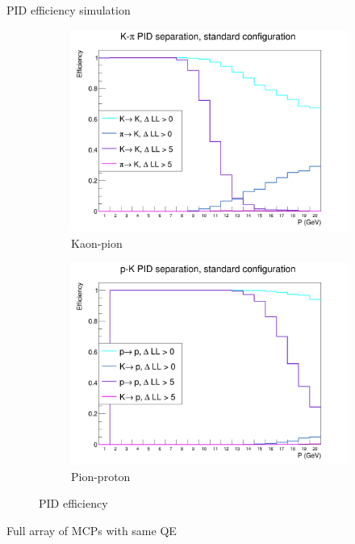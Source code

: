 \documentclass{beamer}
\begin{document}
\begin{frame}{PID efficiency simulation}
  \begin{figure}
    \centering
    \vspace{-0.2cm}
    \begin{subfigure}{0.5\textwidth}
      \includegraphics[width = 1.0\textwidth]{Plots/KaonPionPIDEfficiencyStandard.png}
      \caption{Kaon-pion}
    \end{subfigure}%
    \begin{subfigure}{0.5\textwidth}
      \includegraphics[width = 1.0\textwidth]{Plots/PionProtonPIDEfficiencyStandard.png}
      \caption{Pion-proton}
    \end{subfigure}
    \caption{PID efficiency}
  \end{figure}
  \begin{center}
    Full array of MCPs with same QE
  \end{center}
\end{frame}
\end{document}

